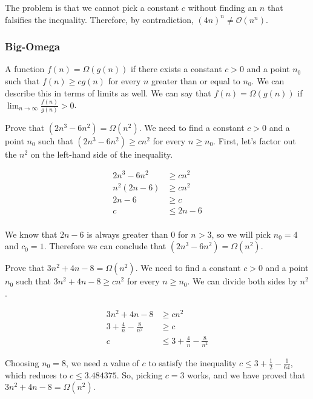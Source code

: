The problem is that we cannot pick a constant $c$ without finding an $n$ that falsifies the inequality. Therefore, by contradiction, $(4n)^n \neq \mathcal{O}(n^n)$.

\subsubsection*{Big-Omega}
A function $f(n) = \Omega(g(n))$ if there exists a constant $c > 0$ and a point $n_0$ such that $f(n) \geq cg(n)$ for every $n$ greater than or equal to $n_0$. We can describe this in terms of limits as well. We can say that $f(n) = \Omega(g(n))$ if $\lim_{n \to \infty} \frac{f(n)}{g(n)} > 0$.

\noindent{}

\example Prove that $(2n^3 - 6n^2) = \Omega(n^2)$. We need to find a constant $c > 0$ and a point $n_0$ such that $(2n^3 - 6n^2) \geq cn^2$ for every $n \geq n_0$. First, let's factor out the $n^2$ on the left-hand side of the inequality.

\begin{align*}
  2n^3 - 6n^2 &\geq cn^2\\
  n^2(2n - 6) &\geq cn^2\\
  2n - 6 &\geq c\\
  c &\leq 2n - 6\\
\end{align*}

We know that $2n - 6$ is always greater than $0$ for $n > 3$, so we will pick $n_0 = 4$ and $c_0 = 1$. Therefore we can conclude that $(2n^3 - 6n^2) = \Omega(n^2)$.

\example Prove that $3n^2 + 4n - 8 = \Omega(n^2)$. We need to find a constant $c > 0$ and a point $n_0$ such that $3n^2 + 4n - 8 \geq cn^2$ for every $n \geq n_0$. We can divide both sides by $n^2$.

\begin{align*}
  3n^2 + 4n - 8 &\geq cn^2\\
  3 + \frac{4}{n} - \frac{8}{n^2} &\geq c\\
  c &\leq 3 + \frac{4}{n} - \frac{8}{n^2}
\end{align*}

Choosing $n_0 = 8$, we need a value of $c$ to satisfy the inequality $c \leq 3 + \frac{1}{2} - \frac{1}{64}$, which reduces to $c \leq 3.484375$. So, picking $c = 3$ works, and we have proved that $3n^2 + 4n - 8 = \Omega(n^2)$.

